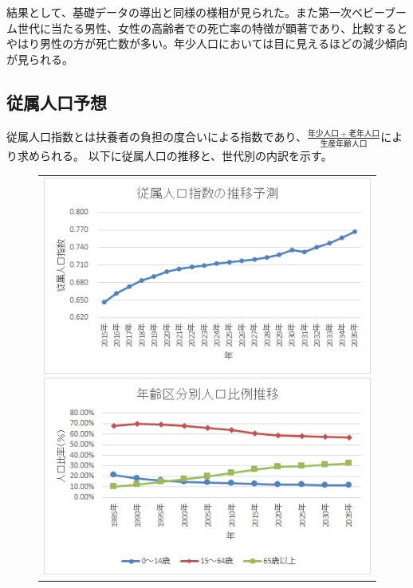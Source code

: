 \documentclass[uplatex, titlepage]{jsarticle}
\begin{document}
  結果として、基礎データの導出と同様の様相が見られた。また第一次ベビーブーム世代に当たる男性、女性の高齢者での死亡率の特徴が顕著であり、比較するとやはり男性の方が死亡数が多い。年少人口においては目に見えるほどの減少傾向が見られる。

\subsection{従属人口予想}

  従属人口指数とは扶養者の負担の度合いによる指数であり、$\frac{年少人口 + 老年人口}{生産年齢人口}$により求められる。
  以下に従属人口の推移と、世代別の内訳を示す。

\begin{figure}[H]
  \centering
    \begin{tabular}{c}
      \begin{minipage}{0.5\hsize}
        \centering
          \includegraphics[scale = 0.9]{fffff/f5.png}
          \caption{}
        \label{fig:graphicx7}
      \end{minipage}
      \begin{minipage}{0.5\hsize}
        \centering
          \includegraphics[scale = 0.9]{fffff/f7.png}
          \caption{}
        \label{fig:graphicx8}
      \end{minipage}
  \end{tabular}
\end{figure}
\end{document}
